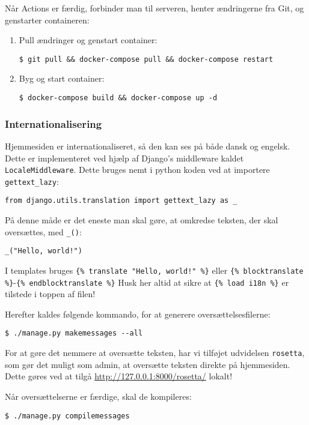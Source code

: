 Når Actions er færdig, forbinder man til serveren, henter ændringerne fra Git, og genstarter containeren:

\begin{enumerate}
    \item Pull ændringer og genstart container:
    \begin{verbatim}
$ git pull && docker-compose pull && docker-compose restart\end{verbatim}
    \item Byg og start container:
    \begin{verbatim}
$ docker-compose build && docker-compose up -d\end{verbatim}
\end{enumerate}

\subsubsection{Internationalisering}

Hjemmesiden er internationaliseret, så den kan ses på både dansk og engelsk.
Dette er implementeret ved hjælp af Django's middleware kaldet \texttt{LocaleMiddleware}.
Dette bruges nemt i python koden ved at importere \texttt{gettext\_lazy}:
\begin{verbatim}
from django.utils.translation import gettext_lazy as _
\end{verbatim}
På denne måde er det eneste man skal gøre, at omkredse teksten, der skal oversættes, med \texttt{\_()}:
\begin{verbatim}
_("Hello, world!")
\end{verbatim}
I templates bruges \texttt{\{\% translate "Hello, world!" \%\}} eller 
\texttt{\{\% blocktranslate \%\}}-\texttt{\{\% endblocktranslate \%\}}
Husk her altid at sikre at \texttt{\{\% load i18n \%\}} er tilstede i toppen af filen!

Herefter kaldes følgende kommando, for at generere oversættelsesfilerne:
\begin{verbatim}
$ ./manage.py makemessages --all
\end{verbatim}
For at gøre det nemmere at oversætte teksten, har vi tilføjet udvidelsen \texttt{rosetta}, som
gør det muligt som admin, at oversætte teksten direkte på hjemmesiden. Dette gøres ved at tilgå
\url{http://127.0.0.1:8000/rosetta/} lokalt!

Når oversættelserne er færdige, skal de kompileres:
\begin{verbatim}
$ ./manage.py compilemessages
\end{verbatim}

